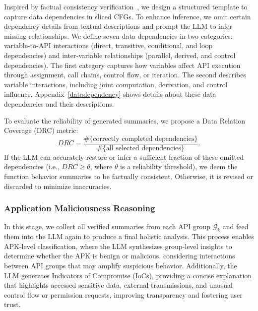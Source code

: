 Inspired by factual consistency verification~\cite{cloze, factasking}, we design a structured template to capture data dependencies in sliced CFGs. To enhance inference, we omit certain dependency details from textual descriptions and prompt the LLM to infer missing relationships. We define seven data dependencies in two categories: variable-to-API interactions (direct, transitive, conditional, and loop dependencies) and inter-variable relationships (parallel, derived, and control dependencies). The first category captures how variables affect API execution through assignment, call chains, control flow, or iteration. The second describes variable interactions, including joint computation, derivation, and control influence. Appendix~\ref{datadependency} shows details about these data dependencies and their descriptions.

To evaluate the reliability of generated summaries, we propose a Data Relation Coverage (DRC) metric:
\begin{equation}
DRC = \frac{\#\{\text{correctly completed dependencies}\}}{\#\{\text{all selected dependencies}\}}.
\end{equation}
If the LLM can accurately restore or infer a sufficient fraction of these omitted dependencies (i.e., $DRC \ge \theta$, where $\theta$ is a reliability threshold), we deem the function behavior summaries to be factually consistent.   Otherwise, it is revised or discarded to minimize inaccuracies.

\subsubsection{Application Maliciousness Reasoning}
In this stage, we collect all verified summaries from each API group $\mathcal{G}_k$ and feed them into the LLM again to produce a final holistic analysis. This process enables APK-level classification, where the LLM synthesizes group-level insights to determine whether the APK is benign or malicious, considering interactions between API groups that may amplify suspicious behavior. Additionally, the LLM generates Indicators of Compromise (IoCs), providing a concise explanation that highlights accessed sensitive data, external transmissions, and unusual control flow or permission requests, improving transparency and fostering user trust. 




